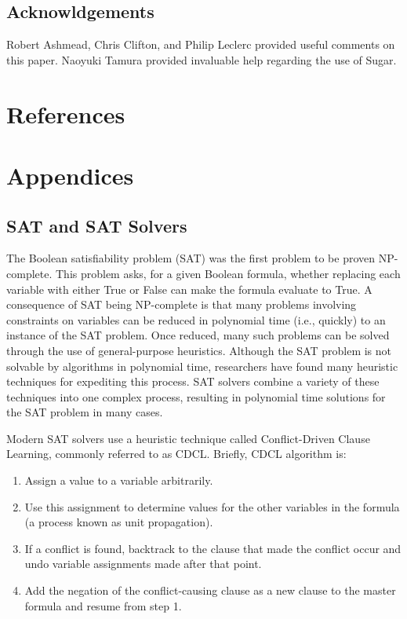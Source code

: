 \documentclass[runningheads]{llncs}
\begin{document}
\subsection{Acknowldgements}
Robert Ashmead, Chris Clifton, and Philip Leclerc provided useful
comments on this paper. Naoyuki Tamura provided invaluable help
regarding the use of Sugar.

\section{References}




\section{Appendices}

\subsection{SAT and SAT Solvers}

The Boolean satisfiability problem (SAT) was the first
problem to be proven NP-complete\cite{cooklevin}. This problem asks,
for a given Boolean formula, whether replacing each variable with
either True or False can make the formula evaluate to True.  A
consequence of SAT being NP-complete is that many problems involving
constraints on variables can be
reduced in polynomial time (i.e., quickly) to an instance of the SAT
problem. Once reduced, many such problems can be solved through the
use of general-purpose heuristics. Although the SAT problem is not solvable by
algorithms in polynomial time, researchers have found many heuristic
techniques for expediting this process. SAT solvers combine a variety
of these techniques into one complex process, resulting in polynomial
time solutions for the SAT problem in many cases.

Modern SAT solvers use a heuristic technique called Conflict-Driven
Clause Learning, commonly referred to as CDCL\cite{cdcl}. Briefly, CDCL algorithm
is:

\begin{enumerate}

\item Assign a value to a variable arbitrarily.
\item Use this assignment to determine values for the other variables
  in the formula (a process known as unit propagation).
\item If a conflict is found, backtrack to the clause that made the
  conflict occur and undo variable assignments made after that point.
\item Add the negation of the conflict-causing clause as a new clause
  to the master formula and resume from step 1.

\end{enumerate}
\end{document}
